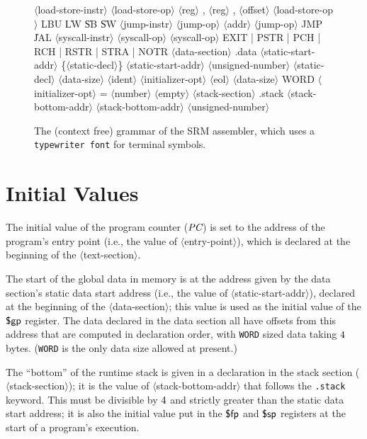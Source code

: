 \documentclass[11pt,letterpaper]{article}
\renewcommand{\nonterm}[1]{\mbox{$\langle$\textrm{#1}$\rangle$}}
\renewcommand{\arbno}[1]{\{#1\}}
\begin{document}
\begin{figure}
\begin{grammar}
\nonterm{load-store-instr} \: \nonterm{load-store-op} \nonterm{reg} , \nonterm{reg} , \nonterm{offset}
\nonterm{load-store-op} \: LBU \| LW \| SB \| SW
\nonterm{jump-instr} \: \nonterm{jump-op} \nonterm{addr}
\nonterm{jump-op} \: JMP \| JAL
\nonterm{syscall-instr} \: \nonterm{syscall-op}
\nonterm{syscall-op} \: EXIT | PSTR | PCH | RCH | RSTR | STRA | NOTR
\nonterm{data-section} \: .data \nonterm{static-start-addr} \arbno{\nonterm{static-decl}}
\nonterm{static-start-addr} \: \nonterm{unsigned-number}
\nonterm{static-decl} \: \nonterm{data-size} \nonterm{ident} \nonterm{initializer-opt} \nonterm{eol}
\nonterm{data-size} \: WORD
\nonterm{initializer-opt} \: = \nonterm{number} \| \nonterm{empty}
\nonterm{stack-section} \: .stack \nonterm{stack-bottom-addr}
\nonterm{stack-bottom-addr} \: \nonterm{unsigned-number}%
\end{grammar}
\caption{
  The (context free) grammar of the SRM assembler, which uses 
  a \texttt{typewriter font} for terminal symbols.
}
\label{fig:cfg}
\end{figure}

\section{Initial Values}
\label{sec:initialvalues}

The initial value of the program counter ($\textit{PC}$) is set to the address of the
program's entry point (i.e., the value of \nonterm{entry-point}), 
which is declared at the beginning of the \nonterm{text-section}.

The start of the global data in memory is at the address given by the
data section's static data start address
(i.e., the value of \nonterm{static-start-addr}), declared at the
beginning of the \nonterm{data-section};
this value is used as the initial value of the $\textsf{\$gp}$ register.
The data declared in the data section all have offsets from this
address that are computed in declaration order, with \texttt{WORD} sized data
taking $4$ bytes.
(\texttt{WORD} is the only data size allowed at present.)

The ``bottom'' of the runtime stack is given in a declaration in
the stack section (\nonterm{stack-section});
it is the value of \nonterm{stack-bottom-addr} that follows the
\texttt{.stack} keyword.
This must be divisible by $4$ and strictly greater than the
static data start address; it is also the initial value put in
the $\textsf{\$fp}$ and $\textsf{\$sp}$ registers at the start of a program's execution.
\end{document}

